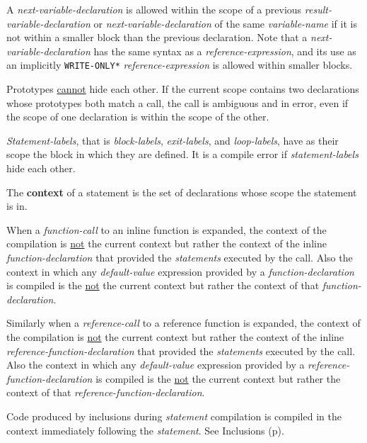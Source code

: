 \documentclass[12pt]{article}
\newcommand{\key}[1]{{\rm \bfseries #1}}
\newcommand{\pagref}[1]{p\pageref{#1}}
\begin{document}
A {\em next-variable-declaration} is allowed
within the scope of a previous {\em result-variable-de\-clar\-a\-tion}
or {\em next-variable-declaration} of the same {\em variable-name}
if it is not within a smaller block than the previous declaration.
Note that a {\em next-variable-declaration} has
the same syntax as a {\em reference-expression}, and its use
as an implicitly {\tt *WRITE-ONLY*} {\em reference-expression}
is allowed within smaller blocks.

Prototypes \underline{cannot} hide each other.  If the
current scope contains two declarations whose prototypes
both match a call, the call is ambiguous and in error,
even if the scope of one declaration is within
the scope of the other.

{\em Statement-labels}, that is {\em block-labels},
{\em exit-labels}, and {\em loop-labels}, have as their scope
the block in which they are defined.  It is a compile
error if {\em statement-labels} hide each other.

The \key{context}\label{CONTEXT} of a statement is the set of declarations
whose scope the statement is in.

When a {\em function-call} to an inline function is expanded,
the context of the compilation is \underline{not} the current context but
rather the context of the inline {\em function-declaration}
that provided the {\em statements} executed by the call.
Also the context in which any {\em default-value} expression
provided by a {\em function-declaration} is compiled\label{DEFAULT-CONTEXT}
is the \underline{not} the current context but
rather the context of that {\em function-declaration}.

Similarly when a {\em reference-call} to a reference function is expanded,
the context of the compilation is \underline{not} the current context but
rather the context of the inline {\em reference-function-declaration}
that provided the {\em statements} executed by the call.
Also the context in which any {\em default-value} expression
provided by a {\em reference-function-declaration}
is compiled is the \underline{not} the current context but
rather the context of that {\em reference-function-declaration}.

Code produced by inclusions during {\em statement} compilation
is compiled in the context immediately following
the {\em statement}.  See Inclusions (\pagref{INCLUSIONS}).
\end{document}
